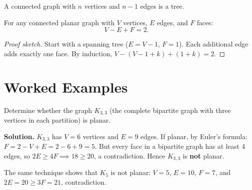 \documentclass[
    language=english,
    doctype=lecture-notes,
    institution=none,
]{../../omnilatex}
\begin{document}
\begin{corollary}
A connected graph with $n$ vertices and $n - 1$ edges is a tree.
\end{corollary}

\begin{theorem}
For any connected planar graph with $V$ vertices, $E$ edges, and $F$ faces:
\[
    V - E + F = 2.
\]
\end{theorem}

\begin{proof}[Proof sketch]
Start with a spanning tree ($E = V - 1$, $F = 1$).  Each additional
edge adds exactly one face.  By induction, $V - (V-1+k) + (1+k) = 2$.
\end{proof}

\section{Worked Examples}

\begin{example}
Determine whether the graph $K_{3,3}$ (the complete bipartite graph
with three vertices in each partition) is planar.

\textbf{Solution.}  $K_{3,3}$ has $V = 6$ vertices and $E = 9$ edges.
If planar, by Euler's formula: $F = 2 - V + E = 2 - 6 + 9 = 5$.
But every face in a bipartite graph has at least 4 edges, so
$2E \geq 4F \implies 18 \geq 20$, a contradiction.  Hence $K_{3,3}$
is \textbf{not} planar.
\end{example}

\begin{remark}
The same technique shows that $K_5$ is not planar: $V = 5$, $E = 10$,
$F = 7$, and $2E = 20 \geq 3F = 21$, contradiction.
\end{remark}
\end{document}
